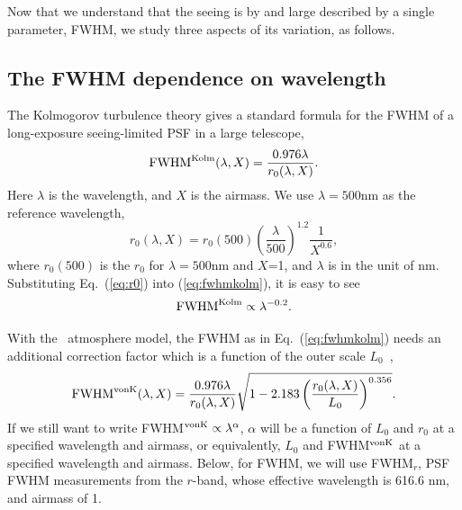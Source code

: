 

Now that we understand that the seeing is by and large described by 
a single parameter, FWHM, we study three aspects of its variation, as follows.


\subsection{The FWHM dependence on wavelength} 

The Kolmogorov turbulence theory gives a standard formula for the FWHM of a long-exposure
seeing-limited PSF in a large telescope,
\begin{equation}
\textrm{FWHM}^{\rm Kolm}(\lambda, X) = \frac{0.976\lambda}{r_0(\lambda,X)}.
\label{eq:fwhmkolm}
\end{equation}
Here $\lambda$ is the wavelength, and $X$ is the airmass.
We use $\lambda = 500$nm as the reference wavelength,
\begin{equation}
r_0(\lambda,X) = r_0(500) \left(\frac{\lambda}{500}\right)^{1.2}
\frac{1}{X^{0.6}},
\label{eq:r0}
\end{equation}
where $r_0(500)$ is the $r_0$ for $\lambda=500$nm and $X$=1, and $\lambda$ is in
the unit of nm.
Substituting Eq.~(\ref{eq:r0}) into (\ref{eq:fwhmkolm}), it is easy to see
\begin{equation}
\textrm{FWHM}^{\rm Kolm} \propto \lambda^{-0.2}.
\end{equation}


With the \vk~atmosphere model, the FWHM as in
Eq.~(\ref{eq:fwhmkolm}) needs an additional correction factor
which is a function of the outer scale $L_0$~\citep{Tokovinin2002},
\begin{equation}
\textrm{FWHM}^{\rm vonK}(\lambda, X) = \frac{0.976\lambda}{r_0(\lambda,X)}
\sqrt{1-2.183\left( \frac{r_0(\lambda,X) }{L_0} \right)^{0.356}}.
\end{equation}
If we still want to write FWHM$^{\rm vonK} \propto \lambda^{\alpha} $, 
$\alpha$ will be a function of $L_0$ and $r_0$ at a specified
wavelength and airmass, or equivalently, $L_0$ and FWHM$^{\rm vonK}$ at a
specified wavelength and airmass. Below, for FWHM, we will use FWHM$_r$,
PSF FWHM measurements from the 
$r$-band,
whose effective wavelength is 616.6 nm, and airmass of 1.

